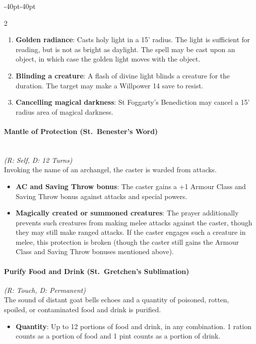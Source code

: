 \documentclass{book}
\providecommand{\tightlist}{%
\setlength{\itemsep}{0pt}\setlength{\parskip}{0pt}}
\begin{document}
\begin{adjustwidth}{-40pt}{-40pt}
\begin{multicols}{2}
\begin{enumerate}
	\def\labelenumi{\arabic{enumi}.}
	\tightlist
	\item
	\textbf{Golden radiance}: Casts holy light in a 15' radius. The light
	is sufficient for reading, but is not as bright as daylight. The spell
	may be cast upon an object, in which case the golden light moves with
	the object.
	\item
	\textbf{Blinding a creature}: A flash of divine light blinds a
	creature for the duration. The target may make a Willpower 14 save to
	resist.
	\item
	\textbf{Cancelling magical darkness}: St Foggarty's Benediction may
	cancel a 15' radius area of magical darkness.
\end{enumerate}

\paragraph{Mantle of Protection (St.~Benester's
	Word)}\label{mantle-of-protection-st.-benesters-word}\mbox{}\\
\emph{(R: Self, D: 12 Turns)}\\
Invoking the name of an archangel, the caster is warded from attacks.

\begin{itemize}
	\tightlist
	\item
	\textbf{AC and Saving Throw bonus}: The caster gains a +1 Armour Class
	and Saving Throw bonus against attacks and special powers.
	\item
	\textbf{Magically created or summoned creatures}: The prayer
	additionally prevents such creatures from making melee attacks against
	the caster, though they may still make ranged attacks. If the caster
	engages such a creature in melee, this protection is broken (though
	the caster still gains the Armour Class and Saving Throw bonuses
	mentioned above).
\end{itemize}

\paragraph{Purify Food and Drink (St.~Gretchen's
	Sublimation)}\label{purify-food-and-drink-st.-gretchens-sublimation}
\emph{(R: Touch, D: Permanent)}\\
The sound of distant goat bells echoes and a quantity of poisoned,
rotten, spoiled, or contaminated food and drink is purified.

\begin{itemize}
	\tightlist
	\item
	\textbf{Quantity}: Up to 12 portions of food and drink, in any
	combination. 1 ration counts as a portion of food and 1 pint counts as
	a portion of drink.
\end{itemize}


\end{multicols}
\end{adjustwidth}
\end{document}
